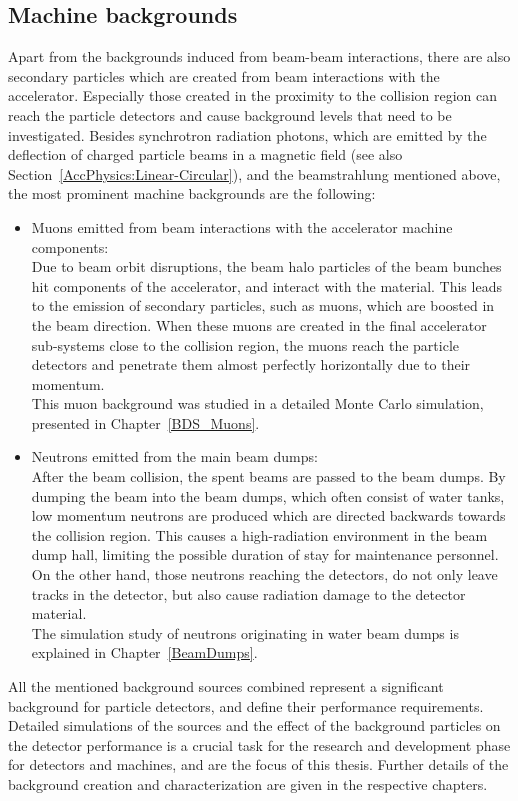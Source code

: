 \subsection{Machine backgrounds}
\label{MachineBackgrounds}

Apart from the backgrounds induced from beam-beam interactions, there are also secondary particles which are created from beam interactions with the accelerator.
Especially those created in the proximity to the collision region can reach the particle detectors and cause background levels that need to be investigated.
Besides synchrotron radiation photons, which are emitted by the deflection of charged particle beams in a magnetic field (see also Section~\ref{AccPhysics:Linear-Circular}), and the beamstrahlung mentioned above, the most prominent machine backgrounds are the following:
\begin{itemize}
 \item Muons emitted from beam interactions with the accelerator machine components:
 \\Due to beam orbit disruptions, the beam halo particles of the beam bunches hit components of the accelerator, and interact with the material.
 This leads to the emission of secondary particles, such as muons, which are boosted in the beam direction.
 When these muons are created in the final accelerator sub-systems close to the collision region, the muons reach the particle detectors and penetrate them almost perfectly horizontally due to their momentum.
 \\This muon background was studied in a detailed Monte Carlo simulation, presented in Chapter~\ref{BDS_Muons}.
 \item Neutrons emitted from the main beam dumps:
 \\After the beam collision, the spent beams are passed to the beam dumps.
 By dumping the beam into the beam dumps, which often consist of water tanks, low momentum neutrons are produced which are directed backwards towards the collision region.
 This causes a high-radiation environment in the beam dump hall, limiting the possible duration of stay for maintenance personnel.
 On the other hand, those neutrons reaching the detectors, do not only leave tracks in the detector, but also cause radiation damage to the detector material.
 \\The simulation study of neutrons originating in water beam dumps is explained in Chapter~\ref{BeamDumps}.
\end{itemize}
All the mentioned background sources combined represent a significant background for particle detectors, and define their performance requirements.
Detailed simulations of the sources and the effect of the background particles on the detector performance is a crucial task for the research and development phase for detectors and machines, and are the focus of this thesis.
Further details of the background creation and characterization are given in the respective chapters.
